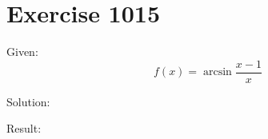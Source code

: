 \documentclass[a4paper, 10pt]{scrartcl}
\begin{document}
\section{Exercise 1015}

Given:
\[
f(x) = \arcsin{\frac{x - 1}{x}}
\]

Solution:

Result:
\end{document}
